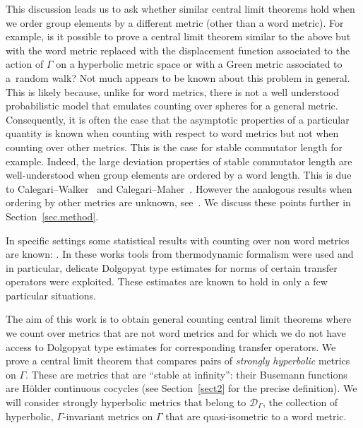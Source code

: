 \documentclass[10pt]{amsart}
\theoremstyle{definition}\newtheorem{defi}[theo]{Definition}\newtheorem{rema}[theo]{Remark}\newtheorem{exam}[theo]{Example}\newtheorem{exem}[theo]{Example}\newtheorem{nota}[theo]{Notation}
\newcommand{\G}{\Gamma}
\newcommand{\Dc}{\mathcal{D}}
\newcounter{setofcase}
\newcounter{case}[setofcase]
\theoremstyle{plain}
\begin{document}
This discussion leads us to ask whether similar central limit theorems hold when we order group elements by a different metric (other than a word metric). For example, is it possible to prove a central limit theorem similar to the above but with the word metric replaced with the displacement function associated to the action of $\G$ on a hyperbolic metric space or with a Green metric associated to a~random walk? Not much appears to be known about this problem in general. This is likely because, unlike for word metrics, there is not a well understood probabilistic model that emulates counting over spheres for a general metric. Consequently, it is often the case that the asymptotic properties of a particular quantity is known when counting with respect to word metrics but not when counting over other metrics. This is the case for stable commutator length for example. Indeed, the large deviation properties of stable commutator length are well-understood when group elements are ordered by a word length. This is due to Calegari--Walker~\cite{calegari.walker} and Calegari--Maher~\cite{calegari.maher}. However the analogous results when ordering by other metrics are unknown, see~\cite[Conjecture~A.11]{calegari.walker}. We discuss these points further in Section~\ref{sec.method}.



In specific settings some statistical results with counting over non word metrics are known: \cite{babillot.ledrappier,cantrell.pollicott,lalley,schwartz.sharp}. In these works tools from thermodynamic formalism were used and in particular, delicate Dolgopyat type estimates for norms of certain transfer operators were exploited. These estimates are known to hold in only a few particular situations.



The aim of this work is to obtain general counting central limit theorems where we count over metrics that are not word metrics and for which we do not have access to Dolgopyat type estimates for corresponding transfer operators. We prove a central limit theorem that compares pairs of \emph{strongly hyperbolic} metrics on $\G$. These are metrics that are ``stable at infinity'': their Busemann functions are H\"older continuous cocycles (see Section~\ref{sect2} for the precise definition). We will consider strongly hyperbolic metrics that belong to $\Dc_\G$, the collection of hyperbolic, $\G$-invariant metrics on $\G$ that are quasi-isometric to a word metric.
\end{document}
